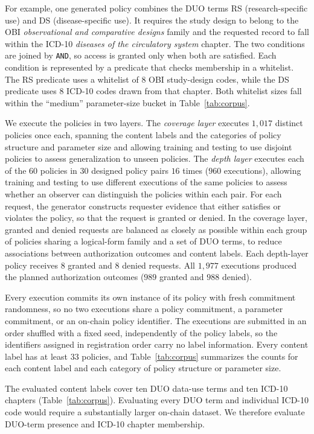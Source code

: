 For example, one generated policy combines the DUO terms RS (research-specific use) and DS (disease-specific use).
It requires the study design to belong to the OBI \emph{observational and comparative designs} family and the requested record to fall within the ICD-10 \emph{diseases of the circulatory system} chapter.
The two conditions are joined by \texttt{AND}, so access is granted only when both are satisfied.
Each condition is represented by a predicate that checks membership in a whitelist.
The RS predicate uses a whitelist of $8$ OBI study-design codes, while the DS predicate uses $8$ ICD-10 codes drawn from that chapter.
Both whitelist sizes fall within the ``medium'' parameter-size bucket in Table~\ref{tab:corpus}.

We execute the policies in two layers.
The \emph{coverage layer} executes $1{,}017$ distinct policies once each, spanning the content labels and the categories of policy structure and parameter size and allowing training and testing to use disjoint policies to assess generalization to unseen policies.
The \emph{depth layer} executes each of the $60$ policies in $30$ designed policy pairs $16$ times ($960$ executions), allowing training and testing to use different executions of the same policies to assess whether an observer can distinguish the policies within each pair.
For each request, the generator constructs requester evidence that either satisfies or violates the policy, so that the request is granted or denied.
In the coverage layer, granted and denied requests are balanced as closely as possible within each group of policies sharing a logical-form family and a set of DUO terms, to reduce associations between authorization outcomes and content labels.
Each depth-layer policy receives $8$ granted and $8$ denied requests.
All $1{,}977$ executions produced the planned authorization outcomes ($989$ granted and $988$ denied).

Every execution commits its own instance of its policy with fresh commitment randomness, so no two executions share a policy commitment, a parameter commitment, or an on-chain policy identifier.
The executions are submitted in an order shuffled with a fixed seed, independently of the policy labels, so the identifiers assigned in registration order carry no label information.
Every content label has at least $33$ policies, and Table~\ref{tab:corpus} summarizes the counts for each content label and each category of policy structure or parameter size.



The evaluated content labels cover ten DUO data-use terms and ten ICD-10 chapters (Table~\ref{tab:corpus}).
Evaluating every DUO term and individual ICD-10 code would require a substantially larger on-chain dataset.
We therefore evaluate DUO-term presence and ICD-10 chapter membership.
